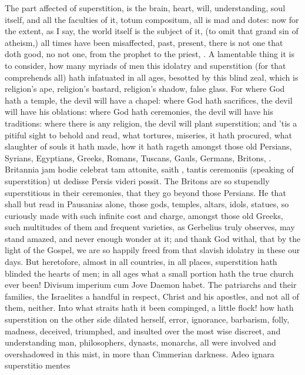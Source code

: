 {The part affected of superstition, is the brain, heart, will,
understanding, soul itself, and all the faculties of it, totum
compositum, all is mad and dotes: now for the extent, as I say, the
world itself is the subject of it, (to omit that grand sin of atheism,)
all times have been misaffected, past, present, there is not one that
doth good, no not one, from the prophet to the priest, \etc{}. A lamentable
thing it is to consider, how many myriads of men this idolatry and
superstition (for that comprehends all) hath infatuated in all ages,
besotted by this blind zeal, which is religion's ape, religion's
bastard, religion's shadow, false glass. For where God hath a temple,
the devil will have a chapel: where God hath sacrifices, the devil will
have his oblations: where God hath ceremonies, the devil will have his
traditions: where there is any religion, the devil will plant
superstition; and 'tis a pitiful sight to behold and read, what
tortures, miseries, it hath procured, what slaughter of souls it hath
made, how it hath rageth amongst those old Persians, Syrians, Egyptians,
Greeks, Romans, Tuscans, Gauls, Germans, Britons, \etc{}. Britannia jam
hodie celebrat tam attonite, saith \Pliny{}, tantis ceremoniis
(speaking of superstition) ut dedisse Persis videri possit. The Britons
are so stupendly superstitious in their ceremonies, that they go beyond
those Persians. He that shall but read in Pausanias alone, those gods,
temples, altars, idols, statues, so curiously made with such infinite
cost and charge, amongst those old Greeks, such multitudes of them and
frequent varieties, as Gerbelius truly observes, may stand
amazed, and never enough wonder at it; and thank God withal, that by
the light of the Gospel, we are so happily freed from that slavish
idolatry in these our days. But heretofore, almost in all countries, in
all places, superstition hath blinded the hearts of men; in all ages
what a small portion hath the true church ever been! Divisum imperium
cum Jove Daemon habet. The patriarchs and their families, the
Israelites a handful in respect, Christ and his apostles, and not all
of them, neither. Into what straits hath it been compinged, a little
flock! how hath superstition on the other side dilated herself, error,
ignorance, barbarism, folly, madness, deceived, triumphed, and insulted
over the most wise discreet, and understanding man, philosophers,
dynasts, monarchs, all were involved and overshadowed in this mist, in
more than Cimmerian darkness. Adeo ignara superstitio mentes
}
